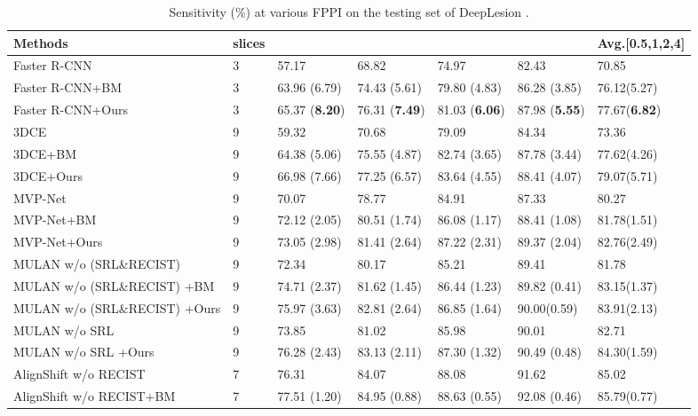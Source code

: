 \documentclass[runningheads]{llncs}
\begin{document}
\begin{table}[t]
\centering
\caption{Sensitivity (\%) at various FPPI on the testing set of DeepLesion \cite{yan18deeplesion}.} \label{results}
\begin{lrbox}{\tablebox}
\begin{tabular}{p{58mm}p{8mm}<{\centering}p{22mm}<{\centering}p{23mm}<{\centering}p{23mm}<{\centering}p{23mm}<{\centering}p{23mm}<{\centering}}
\toprule[1.5pt]
\textbf{Methods}&\textbf{slices}&\textbf{}&\textbf{}&\textbf{}&\textbf{}&Avg.[0.5,1,2,4]\\
\toprule[1pt]
Faster R-CNN \cite{ren2015fasterrcnn}&3&57.17 & 68.82 &74.97 &82.43&70.85\\
Faster R-CNN+BM\cite{li2020bounding} &3&63.96 (6.79) & 74.43 (5.61) &79.80 (4.83) &86.28  (3.85)&76.12(5.27) \\
Faster R-CNN+Ours &3&65.37 (\textbf{8.20}) & 76.31 (\textbf{7.49}) &81.03 (\textbf{6.06}) &87.98  (\textbf{5.55})&77.67(\textbf{6.82}) \\
\midrule
3DCE  \cite{yan20183DCE} &9 &59.32 &70.68&79.09&84.34&73.36\\
3DCE+BM\cite{li2020bounding} &9&64.38 (5.06)&75.55 (4.87) &82.74  (3.65)& 87.78 (3.44)&77.62(4.26)\\
3DCE+Ours &9&66.98 (7.66)&77.25 (6.57) &83.64  (4.55)& 88.41 (4.07)&79.07(5.71)\\
\midrule
MVP-Net  \cite{li2019mvp}&9&70.07&78.77&84.91&87.33&80.27\\
MVP-Net+BM\cite{li2020bounding}&9&72.12 (2.05)&80.51 (1.74) &86.08 (1.17)& 88.41 (1.08)&81.78(1.51)\\
MVP-Net+Ours&9&73.05 (2.98)&81.41 (2.64) &87.22 (2.31)& 89.37 (2.04)&82.76(2.49)\\
\midrule
MULAN w/o (SRL\&RECIST) \cite{yan2019mulan}&9&72.34&80.17&85.21&89.41&81.78\\
MULAN w/o (SRL\&RECIST) +BM\cite{li2020bounding}&9&74.71 (2.37)&81.62 (1.45) &86.44 (1.23)& 89.82 (0.41)&83.15(1.37)\\
MULAN w/o (SRL\&RECIST) +Ours&9&75.97 (3.63)&82.81 (2.64) &86.85 (1.64)& 90.00(0.59)&83.91(2.13)\\
\midrule
MULAN w/o SRL   \cite{yan2019mulan}&9&73.85&81.02&85.98&90.01&82.71\\
MULAN w/o SRL +Ours&9&76.28 (2.43)&83.13 (2.11) &87.30 (1.32)& 90.49 (0.48)&84.30(1.59)\\
\midrule
AlignShift w/o RECIST \cite{yang2020alignshift}&7&76.31&84.07&88.08&91.62&85.02\\
AlignShift w/o RECIST+BM\cite{li2020bounding}&7&77.51 (1.20)&84.95 (0.88) &88.63 (0.55)& 92.08 (0.46)&85.79(0.77)\\

\end{tabular}
\end{lrbox}
\end{table}
\end{document}

